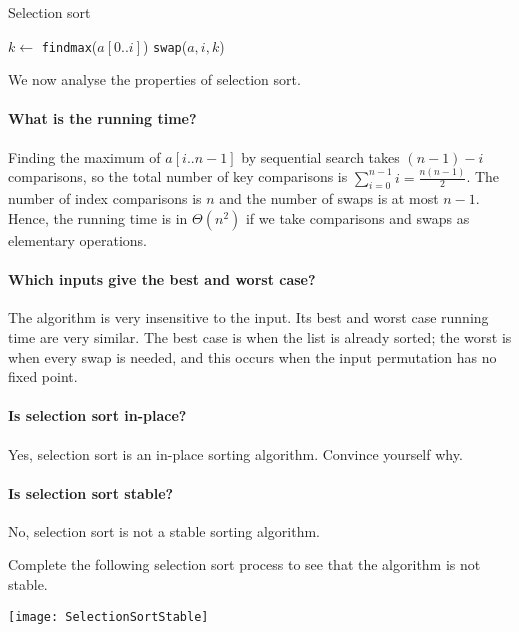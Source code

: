 \begin{algorithm}[H]
  \caption{Selection sort
    \label{alg:selsort}}
\begin{algorithmic}[1]
	\State $k \gets $ \texttt{findmax}($a[0..i]$)
		\State \texttt{swap}($a,i,k$)
	\EndIf
\EndFor
\State {}
\EndFunction
\end{algorithmic}
\end{algorithm}

We now analyse the properties of selection sort.

\paragraph{What is the running time?}
Finding the maximum of $a[i..n-1]$ by sequential search takes $(n-1) - i$ 
comparisons, so the total number of key comparisons is $\sum_{i=0}^{n-1} i  = \frac{n(n-1)}{2}$.
The number of index comparisons is $n$ and the number of swaps is at most $n - 1$.
Hence, the running time is in $\Theta(n^2)$ if we take comparisons and swaps as 
elementary operations.

\paragraph{Which inputs give the best and worst case?}
The algorithm is very insensitive to the input. 
Its best and worst case running time are very similar. 
The best case is when the list is already sorted; the worst is when every swap is needed, 
and this occurs when the input permutation has no fixed point.

\paragraph{Is selection sort in-place?}
Yes, selection sort is an in-place sorting algorithm. Convince yourself why.

\paragraph{Is selection sort stable?}
No, selection sort is not a stable sorting algorithm.
\begin{Boxample}[0]
Complete the following selection sort process to see that the algorithm is not stable.
\begin{center}
\texttt{[image: SelectionSortStable]} 
\end{center}
\end{Boxample}

